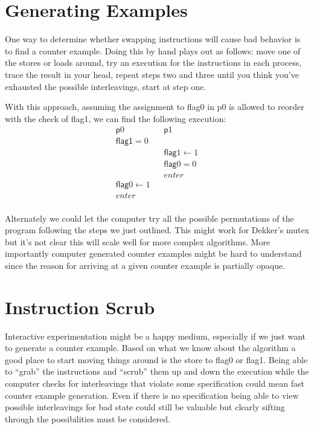\documentclass[9pt,twocolumn]{extarticle}
\newcommand{\ttf}[1]{{\ttfamily #1}}
\begin{document}
\section{Generating Examples}
\vspace{-0.25cm}
One way to determine whether swapping instructions will cause bad behavior is to find a counter example. Doing this by hand plays out as follows: move one of the stores or loads around, try an execution for the instructions in each process, trace the result in your head, repeat steps two and three until you think you've exhausted the possible interleavings, start at step one.

With this approach, assuming the assignment to \ttf{flag0} in \ttf{p0} is allowed to reorder with the check of \ttf{flag1}, we can find the following execution:
\vspace{-0.1cm}
\begin{align*}
    & \mathsf{p}0                 &  & \mathsf{p}1            & \\
    & \mathsf{\mathsf{flag}1} = 0 &  &                        & \\
    &                             &  & \mathsf{flag}1 \gets 1 & \\
 &                             &  & \mathsf{flag}0 = 0     & \\
 &                             &  & enter                  & \\
 & \mathsf{flag}0 \gets 1      &  &                        & \\
 & enter                       &  &                        & \\
\end{align*}
\vspace{-1.05cm}

Alternately we could let the computer try all the possible permutations of the program following the steps we just outlined. This might work for Dekker's mutex but it's not clear this will scale well for more complex algorithms. More importantly computer generated counter examples might be hard to understand since the reason for arriving at a given counter example is partially opaque.

\vspace{-0.25cm}
\section{Instruction Scrub}
\vspace{-0.25cm}
Interactive experimentation might be a happy medium, especially if we just want to generate a counter example. Based on what we know about the algorithm a good place to start moving things around is the store to \ttf{flag0} or \ttf{flag1}. Being able to ``grab'' the instructions and ``scrub'' them up and down the execution while the computer checks for interleavings that violate some specification could mean fast counter example generation. Even if there is no specification being able to view possible interleavings for bad state could still be valuable but clearly sifting through the possibilities must be considered.
\end{document}
